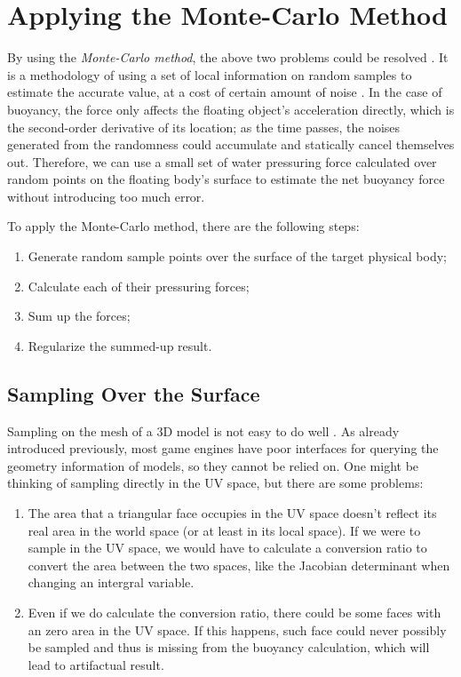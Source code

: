 \section{Applying the Monte-Carlo Method}

By using the \emph{Monte-Carlo method}, the above two problems could be resolved \cite{kroese2014monte}.
It is a methodology of using a set of local information on random samples to estimate the accurate value, at a cost of certain amount of noise \cite{james1980monte}.
In the case of buoyancy, the force only affects the floating object's acceleration directly, which is the second-order derivative of its location;
as the time passes, the noises generated from the randomness could accumulate and statically cancel themselves out.
Therefore, we can use a small set of water pressuring force calculated over random points on the floating body's surface to estimate the net buoyancy force without introducing too much error.

To apply the Monte-Carlo method, there are the following steps:
\begin{enumerate}
	\item Generate random sample points over the surface of the target physical body;
	\item Calculate each of their pressuring forces;
	\item Sum up the forces;
	\item Regularize the summed-up result.
\end{enumerate}

\subsection{Sampling Over the Surface}

Sampling on the mesh of a 3D model is not easy to do well \cite{ebeida2012uniform}.
As already introduced previously, most game engines have poor interfaces for querying the geometry information of models, so they cannot be relied on.
One might be thinking of sampling directly in the UV space, but there are some problems:
\begin{enumerate}
	\item
		The area that a triangular face occupies in the UV space doesn't reflect its real area in the world space (or at least in its local space).
		If we were to sample in the UV space, we would have to calculate a conversion ratio to convert the area between the two spaces, like the Jacobian determinant when changing an intergral variable.
	\item Even if we do calculate the conversion ratio, there could be some faces with an zero area in the UV space.
		If this happens, such face could never possibly be sampled and thus is missing from the buoyancy calculation, which will lead to artifactual result.
\end{enumerate}

